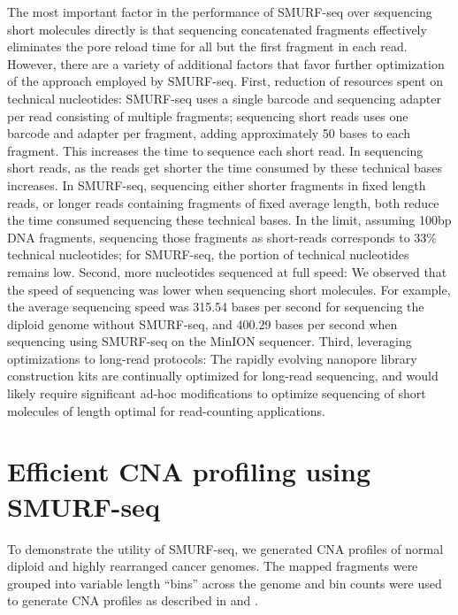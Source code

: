 The most important factor in the performance of SMURF-seq over
sequencing short molecules directly is that sequencing concatenated
fragments effectively eliminates the pore reload time for all but the
first fragment in each read. However, there are a variety of additional
factors that favor further optimization of the approach employed by
SMURF-seq.
First, reduction of resources spent on technical nucleotides: SMURF-seq
uses a single barcode and sequencing adapter per read consisting of
multiple fragments; sequencing short reads uses one barcode and adapter
per fragment, adding approximately 50 bases to each fragment. This
increases the time to sequence each short read. In sequencing short
reads, as the reads get shorter the time consumed by these technical
bases increases. In SMURF-seq, sequencing either shorter fragments in
fixed length reads, or longer reads containing fragments of fixed
average length, both reduce the time consumed sequencing these technical
bases.
%
In the limit, assuming 100bp DNA fragments, sequencing those fragments
as short-reads corresponds to 33\% technical nucleotides; for SMURF-seq,
the portion of technical nucleotides remains low.
Second, more nucleotides sequenced at full speed: We observed that the
speed of sequencing was lower when sequencing short molecules. For
example, the average sequencing speed was 315.54 bases per second for
sequencing the diploid genome without SMURF-seq, and 400.29 bases per
second when sequencing using SMURF-seq on the MinION sequencer.
Third, leveraging optimizations to long-read protocols: The rapidly
evolving nanopore library construction kits are continually optimized
for long-read sequencing, and would likely require significant ad-hoc
modifications to optimize sequencing of short molecules of length
optimal for read-counting applications.


\section{Efficient CNA profiling using SMURF-seq}
To demonstrate the utility of SMURF-seq, we generated CNA profiles of
normal diploid and highly rearranged cancer genomes.  The mapped
fragments were grouped into variable length ``bins'' across the genome
and bin counts were used to generate CNA profiles as described in
\cite{baslan2012genome} and \cite{kendall2014computational}.

